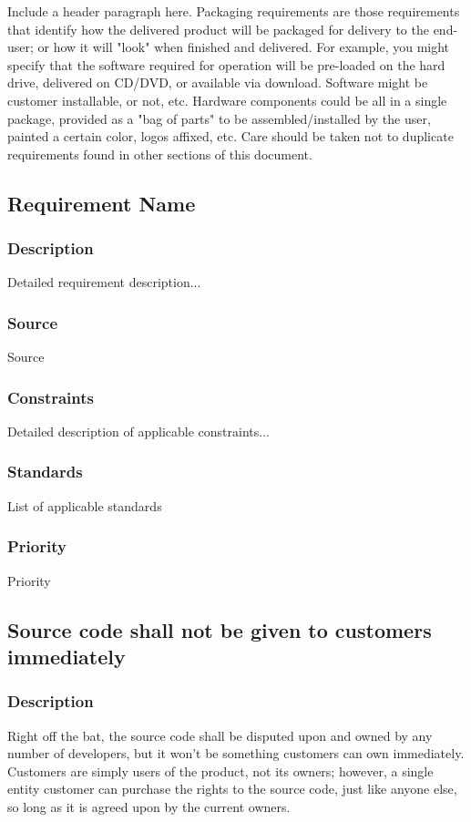 Include a header paragraph here. Packaging requirements are those requirements that identify how the delivered product will be packaged for delivery to the end-user; or how it will "look" when finished and delivered. For example, you might specify that the software required for operation will be pre-loaded on the hard drive, delivered on CD/DVD, or available via download. Software might be customer installable, or not, etc. Hardware components could be all in a single package, provided as a "bag of parts" to be assembled/installed by the user, painted a certain color, logos affixed, etc. Care should be taken not to duplicate requirements found in other sections of this document.

\subsection{Requirement Name}
\subsubsection{Description}
Detailed requirement description...
\subsubsection{Source}
Source
\subsubsection{Constraints}
Detailed description of applicable constraints...
\subsubsection{Standards}
List of applicable standards
\subsubsection{Priority}
Priority

\subsection{Source code shall not be given to customers immediately}
\subsubsection{Description}
Right off the bat, the source code shall be disputed upon and owned by any number of developers, but it won't be something customers can own immediately.  Customers are simply users of the product, not its owners; however, a single entity customer can purchase the rights to the source code, just like anyone else, so long as it is agreed upon by the current owners.
